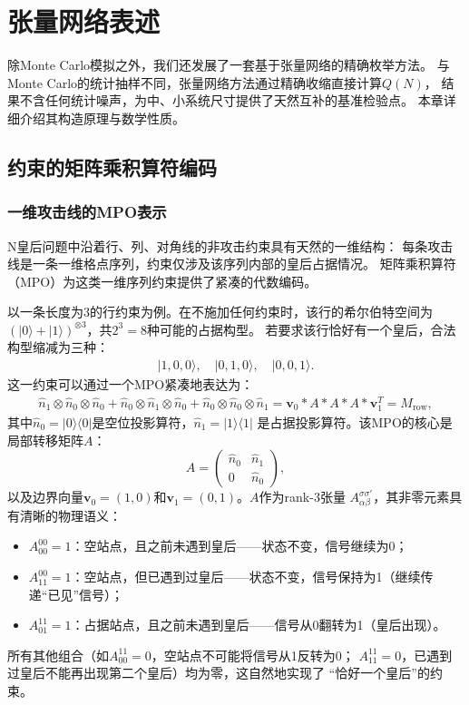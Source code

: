 ﻿\chapter{张量网络表述}

除Monte Carlo模拟之外，我们还发展了一套基于张量网络的精确枚举方法。
与Monte Carlo的统计抽样不同，张量网络方法通过精确收缩直接计算$Q(N)$，
结果不含任何统计噪声，为中、小系统尺寸提供了天然互补的基准检验点。
本章详细介绍其构造原理与数学性质。

\section{约束的矩阵乘积算符编码}

\subsection{一维攻击线的MPO表示}

N皇后问题中沿着行、列、对角线的非攻击约束具有天然的一维结构：
每条攻击线是一条一维格点序列，约束仅涉及该序列内部的皇后占据情况。
矩阵乘积算符（MPO）\cite{Frowis2010}为这类一维序列约束提供了紧凑的代数编码。

以一条长度为3的行约束为例。在不施加任何约束时，该行的希尔伯特空间为
$(|0\rangle+|1\rangle)^{\otimes3}$，共$2^{3}=8$种可能的占据构型。
若要求该行恰好有一个皇后，合法构型缩减为三种：
%
\begin{align}
  |1,0,0\rangle,\quad |0,1,0\rangle,\quad |0,0,1\rangle.
\end{align}
%
这一约束可以通过一个MPO紧凑地表达为：
%
\begin{align}
  \hat{n}_{1}\otimes\hat{n}_{0}\otimes\hat{n}_{0}
  +\hat{n}_{0}\otimes\hat{n}_{1}\otimes\hat{n}_{0}
  +\hat{n}_{0}\otimes\hat{n}_{0}\otimes\hat{n}_{1}
  =\mathbf{v}_{0}*A*A*A*\mathbf{v}_{1}^{T}=M_{\text{row}},
  \label{eq:row_mpo}
\end{align}
%
其中$\hat{n}_{0}=|0\rangle\langle0|$是空位投影算符，$\hat{n}_{1}=|1\rangle\langle1|$
是占据投影算符。该MPO的核心是局部转移矩阵$A$：
%
\begin{equation}
  A = \begin{pmatrix}
    \hat{n}_{0} & \hat{n}_{1} \\
    0           & \hat{n}_{0}
  \end{pmatrix},
  \label{eq:A_matrix}
\end{equation}
%
以及边界向量$\mathbf{v}_{0}=(1,0)$和$\mathbf{v}_{1}=(0,1)$。$A$作为rank-3张量
$A_{\alpha\beta}^{\sigma\sigma'}$，其非零元素具有清晰的物理语义：
%
\begin{itemize}
  \item $A_{00}^{00}=1$：空站点，且之前未遇到皇后——状态不变，信号继续为0；
  \item $A_{11}^{00}=1$：空站点，但已遇到过皇后——状态不变，信号保持为1（继续传递``已见''信号）；
  \item $A_{01}^{11}=1$：占据站点，且之前未遇到皇后——信号从0翻转为1（皇后出现）。
\end{itemize}
%
所有其他组合（如$A_{00}^{11}=0$，空站点不可能将信号从1反转为0；
$A_{11}^{11}=0$，已遇到过皇后不能再出现第二个皇后）均为零，这自然地实现了
``恰好一个皇后''的约束。

